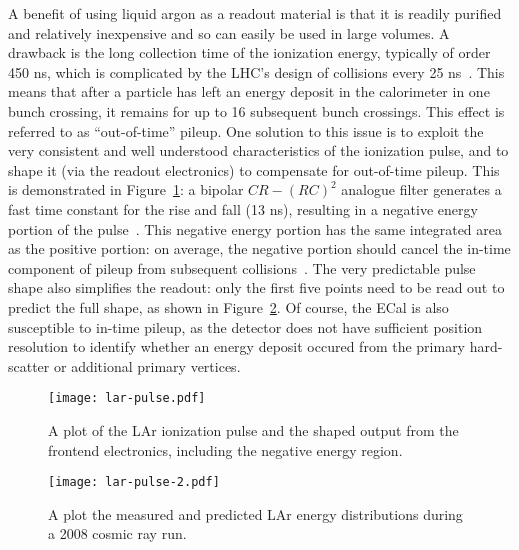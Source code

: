 A benefit of using liquid argon as a readout material is that it is readily purified and relatively inexpensive and so can easily be used in large volumes. A drawback is the long collection time of the ionization energy, typically of order 450 ns, which is complicated by the LHC's design of collisions every 25 ns~\cite{ATLASPaper,LARPaper}. This means that after a particle has left an energy deposit in the calorimeter in one bunch crossing, it remains for up to 16 subsequent bunch crossings. This effect is referred to as ``out-of-time'' pileup. One solution to this issue is to exploit the very consistent and well understood characteristics of the ionization pulse, and to shape it (via the readout electronics) to compensate for out-of-time pileup. This is demonstrated in Figure~\ref{fig:detector:lar-pulse}: a bipolar $CR -(RC)^2$ analogue filter generates a fast time constant for the rise and fall (13 ns), resulting in a negative energy portion of the pulse~\cite{LARPaper}. This negative energy portion has the same integrated area as the positive portion: on average, the negative portion should cancel the in-time component of pileup from subsequent collisions~\cite{Loch}. The very predictable pulse shape also simplifies the readout: only the first five points need to be read out to predict the full shape, as shown in Figure~\ref{fig:detector:lar-pulse-2}. Of course, the ECal is also susceptible to in-time pileup, as the detector does not have sufficient position resolution to identify whether an energy deposit occured from the primary hard-scatter or additional primary vertices.


\begin{figure}
\centering
\texttt{[image: lar-pulse.pdf]}
\label{fig:detector:lar-pulse}
\caption{A plot of the LAr ionization pulse and the shaped output from the frontend electronics, including the negative energy region.}
\end{figure}



\begin{figure}
\centering
\texttt{[image: lar-pulse-2.pdf]}
\label{fig:detector:lar-pulse-2}
\caption{A plot the measured and predicted LAr energy distributions during a 2008 cosmic ray run.}
\end{figure}


